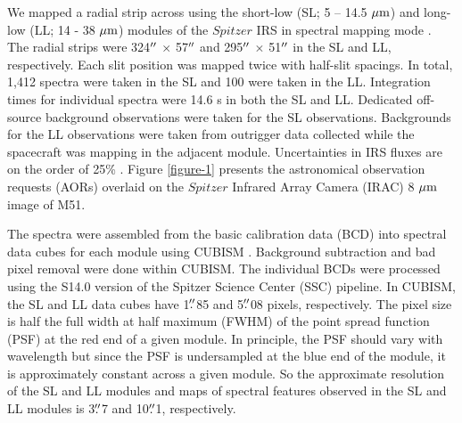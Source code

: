 \documentclass[manuscript]{aastex}
\begin{document}
We mapped a radial strip across  using the short-low
(SL; 5 -- 14.5 $\mbox{$\mu$m}$) and long-low (LL; 14 - 38 $\mbox{$\mu$m}$) 
modules of the $Spitzer$ IRS in spectral
mapping mode \citep{hou04}.  The radial strips were 324$\mbox{$^{\prime\prime}$}$ $\times$
57$\mbox{$^{\prime\prime}$}$ and 295$\mbox{$^{\prime\prime}$}$ $\times$ 51$\mbox{$^{\prime\prime}$}$ in the SL and LL,
respectively.  Each slit position was mapped twice with half-slit spacings.  In
total, 1,412 spectra were taken in the SL and 100 were taken in the LL.  
Integration times for individual 
spectra were 14.6 s in both the SL and LL.  Dedicated off-source 
background observations were taken for the SL observations.  Backgrounds for the
LL observations were taken from outrigger data collected while the
spacecraft was mapping in the adjacent module.  Uncertainties in 
IRS fluxes are on the order of 25\% \citep{smi04}.  Figure \ref{figure-1} 
presents the astronomical observation requests (AORs)
overlaid on the $Spitzer$ Infrared Array Camera (IRAC) 8 $\mbox{$\mu$m}$ image of M51.

The spectra were assembled from the basic calibration data (BCD) into
spectral data cubes for each module using CUBISM \citep{ken03, smi04, smi07b}.
Background subtraction and bad pixel removal were done within CUBISM.
The individual BCDs were processed using the S14.0 version of
the Spitzer Science Center (SSC) pipeline.  In CUBISM, the SL and LL
data cubes have 1$\mbox{$.\!\!^{\prime\prime}$}$85 and 5$\mbox{$.\!\!^{\prime\prime}$}$08 pixels,
respectively.  The pixel size is half the full width at half 
maximum (FWHM) of the point spread function (PSF)
at the red end of a given module.  In principle, the PSF should 
vary with wavelength but since the PSF is
undersampled at the blue end of the module, it is approximately
constant across a given module.  So the approximate resolution of the
SL and LL modules and maps of spectral features observed 
in the SL and LL modules is 3$\mbox{$.\!\!^{\prime\prime}$}$7 and 10$\mbox{$.\!\!^{\prime\prime}$}$1, respectively.
\end{document}
